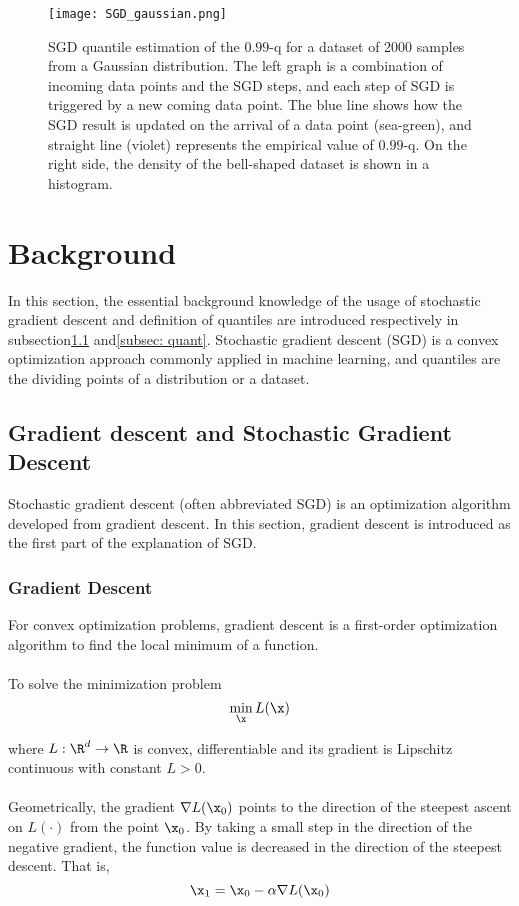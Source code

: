 \begin{figure*}[h!]
	\texttt{[image: SGD\_gaussian.png]}
    \caption{SGD quantile estimation of the $0.99$-q for a dataset of 2000 samples from a Gaussian distribution. The left graph is a combination of incoming data points and the SGD steps, and each step of SGD is triggered by a new coming data point. The blue line shows how the SGD result is updated on the arrival of a data point (sea-green), and straight line (violet) represents the empirical value of $0.99$-q. On the right side, the density of the bell-shaped dataset is shown in a histogram.}
    \label{fig: SGD_quant}
\end{figure*}


\section{Background}
In this section, the essential background knowledge of the usage of stochastic gradient descent and definition of quantiles are introduced respectively in subsection\ref{subsec: sgd} and\ref{subsec: quant}. Stochastic gradient descent (SGD) is a convex optimization approach commonly applied in machine learning, and quantiles are the dividing points of a distribution or a dataset.

\subsection{Gradient descent and Stochastic Gradient Descent}
\label{subsec: sgd}
    Stochastic gradient descent (often abbreviated SGD) is an optimization algorithm developed from gradient descent. 
    In this section, gradient descent is introduced as the first part of the explanation of SGD.

    \subsubsection{Gradient Descent}
        For convex optimization problems, gradient descent is a first-order optimization algorithm 
        to find the local minimum of a function.
        \\\\
        To solve the minimization problem 
        \begin{equation}
            \min_{\x} L(\x) 
        \end{equation} 
        
        where $L : \R^d \to \R$ is convex, differentiable and its gradient is Lipschitz continuous with constant
        $L > 0$.
        \\\\
        Geometrically, the gradient $\nabla L(\x_0)$ points to the direction of the steepest ascent on $L(\cdot)$ 
        from the point $\x_0$. 
        By taking a small step in the direction of the negative gradient, the function value is decreased in the 
        direction of the steepest descent. That is,
        \begin{equation}
            \x_1  = \x_0 - \alpha \nabla L(\x_0)
        \end{equation}
    
